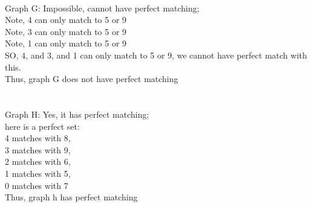 \documentclass[11pt]{article}
\begin{document}

\begin{solution}
	\\Graph G: Impossible, cannot have perfect matching;
    \\Note,  4 can only match to 5 or 9
    \\Note,  3 can only match to 5 or 9
    \\Note,  1 can only match to 5 or 9
    \\SO, 4, and 3, and 1 can only match to 5 or 9, we cannot have perfect match with this.
    \\Thus, graph G does not have perfect matching
    \\
    \\
	\\Graph H: Yes, it has perfect matching;
	\\here is a perfect set:
	\\4 matches with 8,
	\\3 matches with 9,
	\\2 matches with 6,
	\\1 matches with 5,
	\\0 matches with 7
	\\Thus, graph h has perfect matching
\end{solution}

\end{document}
